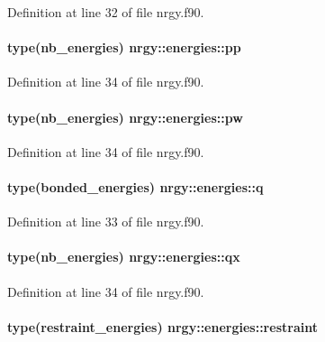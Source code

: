 Definition at line 32 of file nrgy.\-f90.

\hypertarget{structnrgy_1_1energies_ab5f70d1fcc0d9af5982cff6ebe21a60c}{
\paragraph[{pp}]{\setlength{\rightskip}{0pt plus 5cm}type({\bf nb\-\_\-energies}) nrgy\-::energies\-::pp}}\label{structnrgy_1_1energies_ab5f70d1fcc0d9af5982cff6ebe21a60c}


Definition at line 34 of file nrgy.\-f90.

\hypertarget{structnrgy_1_1energies_aed1b82bfdc825e267d03fd9e85b79042}{
\paragraph[{pw}]{\setlength{\rightskip}{0pt plus 5cm}type({\bf nb\-\_\-energies}) nrgy\-::energies\-::pw}}\label{structnrgy_1_1energies_aed1b82bfdc825e267d03fd9e85b79042}


Definition at line 34 of file nrgy.\-f90.

\hypertarget{structnrgy_1_1energies_aca481dfb8bb5ae4155ef5072aa87eccb}{
\paragraph[{q}]{\setlength{\rightskip}{0pt plus 5cm}type({\bf bonded\-\_\-energies}) nrgy\-::energies\-::q}}\label{structnrgy_1_1energies_aca481dfb8bb5ae4155ef5072aa87eccb}


Definition at line 33 of file nrgy.\-f90.

\hypertarget{structnrgy_1_1energies_a7d9210f0441cd8b7b41545abd3fe6da0}{
\paragraph[{qx}]{\setlength{\rightskip}{0pt plus 5cm}type({\bf nb\-\_\-energies}) nrgy\-::energies\-::qx}}\label{structnrgy_1_1energies_a7d9210f0441cd8b7b41545abd3fe6da0}


Definition at line 34 of file nrgy.\-f90.

\hypertarget{structnrgy_1_1energies_abee183d6277134e1ef28eabc772cd291}{
\paragraph[{restraint}]{\setlength{\rightskip}{0pt plus 5cm}type({\bf restraint\-\_\-energies}) nrgy\-::energies\-::restraint}}\label{structnrgy_1_1energies_abee183d6277134e1ef28eabc772cd291}


